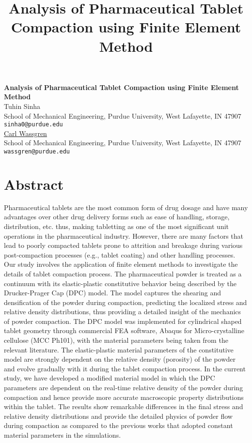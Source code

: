 \title{Analysis of Pharmaceutical Tablet Compaction using Finite Element Method}
\author{} \institute{}

\begin{center}

\textbf{\Large Analysis of Pharmaceutical Tablet Compaction using Finite Element Method}\\
\vspace{10mm}
{\large Tuhin Sinha}\\
School of Mechanical Engineering, Purdue University, West Lafayette, IN 47907\\
{\tt sinha0@purdue.edu}\\
\vspace{4mm}
{\large \underline{Carl Wassgren}}\\
School of Mechanical Engineering, Purdue University, West Lafayette, IN 47907\\
{\tt wassgren@purdue.edu}

\end{center}

\section*{Abstract}

Pharmaceutical tablets are the most common form of drug dosage and have many advantages over other drug delivery forms such as ease of handling, storage, distribution, etc. thus, making tabletting as one of the most significant unit operations in the pharmaceutical industry. However, there are many factors that lead to poorly compacted tablets prone to attrition and breakage during various post-compaction processes (e.g., tablet coating) and other handling processes. Our study involves the application of finite element methods to investigate the details of tablet compaction process. The pharmaceutical powder is treated as a continuum with its elastic-plastic constitutive behavior being described by the Drucker-Prager Cap (DPC) model. The model captures the shearing and densification of the powder during compaction, predicting the localized stress and relative density distributions, thus providing a detailed insight of the mechanics of powder compaction. The DPC model was implemented for cylindrical shaped tablet geometry through commercial FEA software, Abaqus for Micro-crystalline cellulose (MCC Ph101), with the material parameters being taken from the relevant literature. The elastic-plastic material parameters of the constitutive model are strongly dependent on the relative density (porosity) of the powder and evolve gradually with it during the tablet compaction process. In the current study, we have developed a modified material model in which the DPC parameters are dependent on the real-time relative density of the powder during compaction and hence provide more accurate macroscopic property distributions within the tablet. The results show remarkable differences in the final stress and relative density distributions and provide the detailed physics of powder flow during compaction as compared to the previous works that adopted constant material parameters in the simulations.